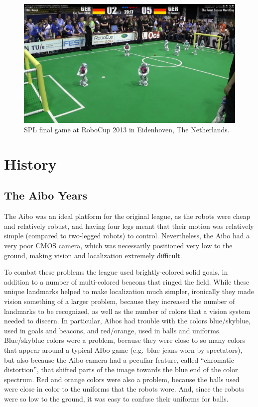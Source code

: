 \documentclass{llncs}
\begin{document}
\begin{figure}[t]
\centerline{
\includegraphics[width=0.9\columnwidth]{"spl2013"}
}
  \caption{SPL final game at RoboCup 2013 in Eidenhoven, The Netherlands.}
  \label{spl2013}
\end{figure} 

\section{History}

\subsection{The Aibo Years}

The Aibo was
an ideal platform for the original league, as the robots were cheap and relatively robust,
and having four legs meant that their motion was relatively simple (compared
to two-legged robots) to control. Nevertheless, the Aibo had a very poor CMOS camera, which was necessarily positioned very low to the ground, making vision and localization extremely
difficult. 

To combat these problems the league used brightly-colored solid goals, in addition
to a number of multi-colored beacons that ringed the field. While these unique
landmarks helped to make localization much simpler, ironically they made
vision something of a larger problem, because they increased the number of landmarks
to be recognized, as well as the number of colors that a vision system needed to
discern. In particular, Aibos had trouble with the colors blue/skyblue, used in
goals and beacons, and red/orange, used in balls and uniforms. Blue/skyblue colors
were a problem, because they were close to so many colors that appear
around a typical AIbo game (e.g.~blue jeans worn by spectators), but also because
the Aibo camera had a peculiar feature, called ``chromatic distortion'', that
shifted parts of the image towards the blue end of the color spectrum. Red
and orange colors were also a problem, because the balls used were close in color to the
uniforms that the robots wore. And, since the robots were so low to the ground, it
was easy to confuse their uniforms for balls.
\end{document}
